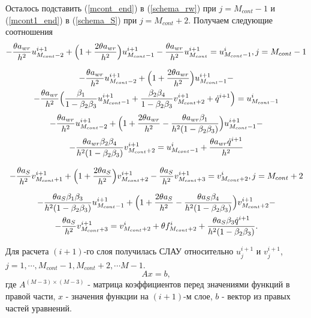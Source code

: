 Осталось подставить (\ref{mcont_end}) в (\ref{schema_rw}) при $j = M_{cont} - 1$ и (\ref{mcont1_end}) в (\ref{schema_S}) при $j = M_{cont} + 2$. Получаем следующие соотношения
$$
-\frac{\theta a_{wr}}{h^2}u_{M_{cont} - 2}^{i+1} + \Bigl(1 + \frac{2\theta a_{wr}}{h^2}\Bigr)u_{M_{cont} - 1}^{i+1}-\frac{\theta a_{wr}}{h^2}u_{M_{cont}}^{i+1} = u_{M_{cont} - 1}^{i}, j = M_{cont} - 1
$$

\begin{multline}
-\frac{\theta a_{wr}}{h^2}u_{M_{cont} - 2}^{i+1} + 
\Bigl(1 + \frac{2\theta a_{wr}}{h^2}\Bigr)u_{M_{cont} - 1}^{i+1} - \\ 
- \frac{\theta a_{wr}}{h^2}\Bigl(\frac{\beta_1}{1-\beta_2 \beta_3} u_{M_{cont} - 1}^{i+1} +
\frac{\beta_2 \beta_4}{1-\beta_2 \beta_3} v_{M_{cont} + 2}^{i+1} + \dot q^{i+1}\Bigr) =
u_{M_{cont} - 1}^{i}
\notag
\end{multline}
\begin{multline}
-\frac{\theta a_{wr}}{h^2}u_{M_{cont} - 2}^{i+1} + 
\Bigl(1 + \frac{2\theta a_{wr}}{h^2}-\frac{\theta a_{wr} \beta_1}{h^2(1-\beta_2 \beta_3)}\Bigr)u_{M_{cont} - 1}^{i+1} - \\ 
- \frac{\theta a_{wr}\beta_2 \beta_4}{h^2(1-\beta_2 \beta_3)}v_{M_{cont} + 2}^{i+1} =
u_{M_{cont} - 1}^{i} + \frac{\theta a_{wr} \dot q^{i+1}}{h^2}
\end{multline}

$$
-\frac{\theta a_S}{h^2}v_{M_{cont} + 1}^{i+1} + \Bigl(1 + \frac{2\theta a_S}{h^2}\Bigr)v_{M_{cont} + 2}^{i+1}-\frac{\theta a_S}{h^2}v_{M_{cont} + 3}^{i+1} = v_{M_{cont} + 2}^{i}, j = M_{cont} + 2
$$

\begin{multline}
-\frac{\theta a_S\beta_1 \beta_3}{h^2(1-\beta_2 \beta_3)}u_{M_{cont} - 1}^{i+1} + 
\Bigl(1 + \frac{2\theta a_S}{h^2}-\frac{\theta a_S \beta_4}{h^2(1-\beta_2 \beta_3)}\Bigr)v_{M_{cont} + 2}^{i+1} - \\ 
-\frac{\theta a_S}{h^2} v_{M_{cont} + 3}^{i+1} =
v_{M_{cont} + 2}^{i} + \theta f^i_{M_{cont} + 2} + \frac{\theta a_S \beta_3 \dot q^{i+1}}{h^2(1-\beta_2 \beta_3)}.
\end{multline}

Для расчета $(i+1)$-го слоя получилась СЛАУ относительно $u^{i+1}_j$ и $v^{i+1}_j$, $j = 1, \cdots, M_{cont} - 1, M_{cont} + 2, \cdots M - 1$.
\begin{equation}
Ax = b,
\label{SLAU}
\end{equation}
где $A^{(M-3)\times (M-3)}$ - матрица коэффициентов перед значениями функций в правой части, $x$ - значения функции на $(i+1)$-м слое, $b$ - вектор из правых частей уравнений.

